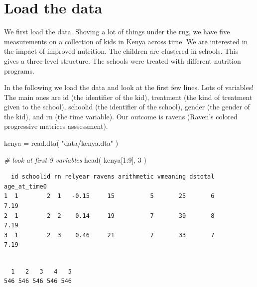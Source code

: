 \documentclass[
  letterpaper,
  DIV=11,
  numbers=noendperiod]{scrreprt}
\newenvironment{Shaded}{\begin{snugshade}}{\end{snugshade}}
\newcommand{\CommentTok}[1]{\textcolor[rgb]{0.38,0.63,0.69}{\textit{#1}}}
\newcommand{\DecValTok}[1]{\textcolor[rgb]{0.25,0.63,0.44}{#1}}
\newcommand{\FunctionTok}[1]{\textcolor[rgb]{0.02,0.16,0.49}{#1}}
\newcommand{\NormalTok}[1]{\textcolor[rgb]{0.00,0.44,0.13}{#1}}
\newcommand{\OtherTok}[1]{\textcolor[rgb]{0.00,0.44,0.13}{#1}}
\newcommand{\SpecialCharTok}[1]{\textcolor[rgb]{0.25,0.44,0.63}{#1}}
\newcommand{\StringTok}[1]{\textcolor[rgb]{0.25,0.44,0.63}{#1}}
\begin{document}
\hypertarget{load-the-data-1}{%
\section{Load the data}\label{load-the-data-1}}

We first load the data. Shoving a lot of things under the rug, we have
five measurements on a collection of kids in Kenya across time. We are
interested in the impact of improved nutrition. The children are
clustered in schools. This gives a three-level structure. The schools
were treated with different nutrition programs.

In the following we load the data and look at the first few lines. Lots
of variables! The main ones are id (the identifier of the kid),
treatment (the kind of treatment given to the school), schoolid (the
identifier of the school), gender (the gender of the kid), and rn (the
time variable). Our outcome is ravens (Raven's colored progressive
matrices asssessment).

\begin{Shaded}
\begin{Highlighting}[]
\NormalTok{kenya }\OtherTok{=} \FunctionTok{read.dta}\NormalTok{( }\StringTok{"data/kenya.dta"}\NormalTok{ )}

\CommentTok{\# look at first 9 variables}
\FunctionTok{head}\NormalTok{( kenya[}\DecValTok{1}\SpecialCharTok{:}\DecValTok{9}\NormalTok{], }\DecValTok{3}\NormalTok{ )}
\end{Highlighting}
\end{Shaded}

\begin{verbatim}
  id schoolid rn relyear ravens arithmetic vmeaning dstotal age_at_time0
1  1        2  1   -0.15     15          5       25       6         7.19
2  1        2  2    0.14     19          7       39       8         7.19
3  1        2  3    0.46     21          7       33       7         7.19
\end{verbatim}

\begin{Shaded}
\end{Shaded}

\begin{verbatim}

  1   2   3   4   5 
546 546 546 546 546 
\end{verbatim}
\end{document}
